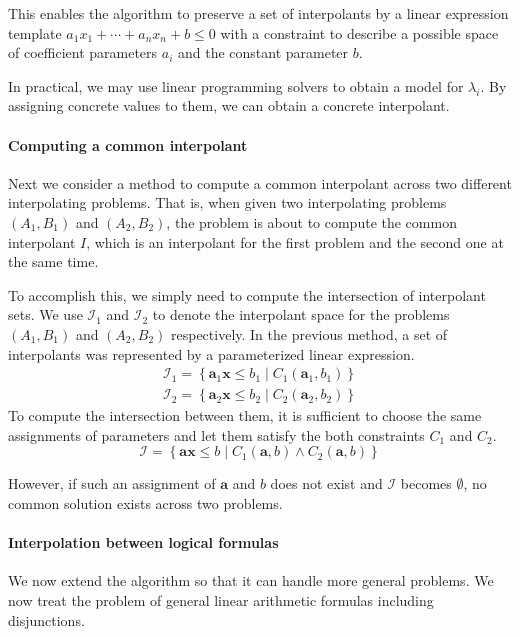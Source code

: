 This enables the algorithm to preserve a set of interpolants by a
linear expression template $a_1 x_1 + \cdots + a_n x_n + b \leq 0$
with a constraint to describe a possible space of coefficient
parameters $a_i$ and the constant parameter $b$.

In practical, we may use linear programming solvers to obtain a model
for $\lambda_i$.  By assigning concrete values to them, we can obtain
a concrete interpolant.


\paragraph{Computing a common interpolant}
Next we consider a method to compute a common interpolant across two
different interpolating problems.  That is, when given two
interpolating problems $\left(A_1, B_1 \right)$ and $\left(A_2, B_2
\right)$, the problem is about to compute the common interpolant $I$,
which is an interpolant for the first problem and the second one at
the same time.

To accomplish this, we simply need to compute the intersection of
interpolant sets.  We use $\mathcal{I}_1$ and $\mathcal{I}_2$ to
denote the interpolant space for the problems $\left(A_1, B_1 \right)$
and $\left(A_2, B_2 \right)$ respectively.  In the previous method, a
set of interpolants was represented by a parameterized linear
expression.
\begin{align*}
\mathcal{I}_1 = \left\lbrace \mathbf{a}_1 \mathbf{x} \leq b_1 \mid
C_1 (\mathbf{a}_1, b_1 ) \right\rbrace \\
\mathcal{I}_2 = \left\lbrace \mathbf{a}_2 \mathbf{x} \leq b_2 \mid
C_2 (\mathbf{a}_2, b_2 ) \right\rbrace
\end{align*}
To compute the intersection between them, it is sufficient to choose
the same assignments of parameters and let them satisfy the both
constraints $C_1$ and $C_2$.
\[ \mathcal{I} = \left\lbrace \mathbf{a} \mathbf{x} \leq b \mid
C_1(\mathbf{a}, b) \wedge C_2(\mathbf{a}, b) \right\rbrace \]

However, if such an assignment of $\mathbf{a}$ and $b$ does not exist
and $\mathcal{I}$ becomes $\emptyset$, no common solution exists
across two problems.


\paragraph{Interpolation between logical formulas}
We now extend the algorithm so that it can handle more general
problems.  We now treat the problem of general linear arithmetic
formulas including disjunctions.

